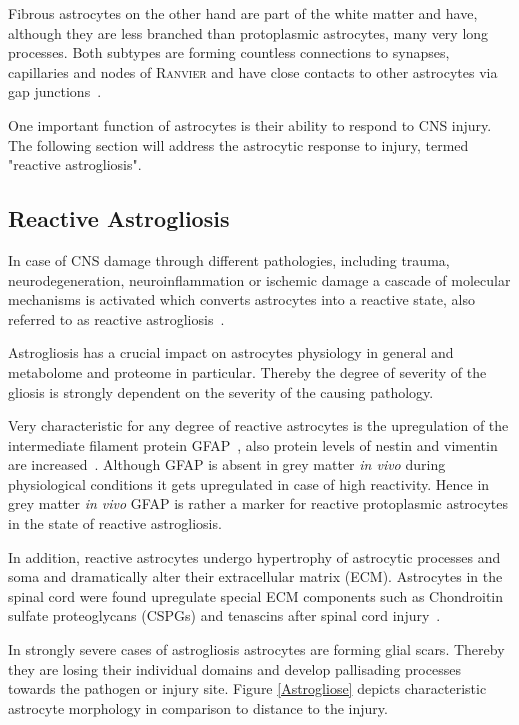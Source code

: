 \documentclass[a4paper,11pt,bibtotocnumbered]{article}
\begin{document}
Fibrous astrocytes on the other hand are part of the white matter and have, although they are less branched than protoplasmic astrocytes, many very long processes. Both subtypes are forming countless connections to synapses, capillaries and nodes of \textsc{Ranvier} and have close contacts to other astrocytes via gap junctions~\cite{Sofroniew2010}.


One important function of astrocytes is their ability to respond to CNS injury. The following section will address the astrocytic response to injury, termed "reactive astrogliosis".





 
\subsection{Reactive Astrogliosis} 

In case of CNS damage through different pathologies, including trauma, neurodegeneration, neuroinflammation or ischemic damage a cascade of molecular mechanisms is activated which converts astrocytes into a reactive state, also referred to as reactive astrogliosis~\cite{Schiweck2018, Pekny2014}.

Astrogliosis has a crucial impact on astrocytes physiology in general and metabolome and proteome in particular.
Thereby the degree of severity of the gliosis is strongly dependent on the severity of the causing pathology. 


Very characteristic for any degree of reactive astrocytes is the upregulation of the intermediate filament protein GFAP~\cite{Garcia2004}, also protein levels of nestin and vimentin are increased~\cite{Karimi-Abdolrezaee2012}. Although GFAP is absent in grey matter \textit{in vivo} during physiological conditions it gets upregulated in case of high reactivity. Hence in grey matter \textit{in vivo} GFAP is rather a marker for reactive protoplasmic astrocytes in the state of reactive astrogliosis. 
 
 
In addition, reactive astrocytes undergo hypertrophy of astrocytic processes and soma and dramatically alter their extracellular matrix (ECM). Astrocytes in the spinal cord were found upregulate special ECM components such as Chondroitin sulfate proteoglycans (CSPGs) and tenascins after spinal cord injury~\cite{Karimi-Abdolrezaee2012}. 

In strongly severe cases of astrogliosis astrocytes are forming glial scars. Thereby they are losing their individual domains and develop pallisading processes towards the pathogen or injury site.
Figure \ref{Astrogliose} depicts characteristic astrocyte morphology in comparison to distance to the injury.
\end{document}
